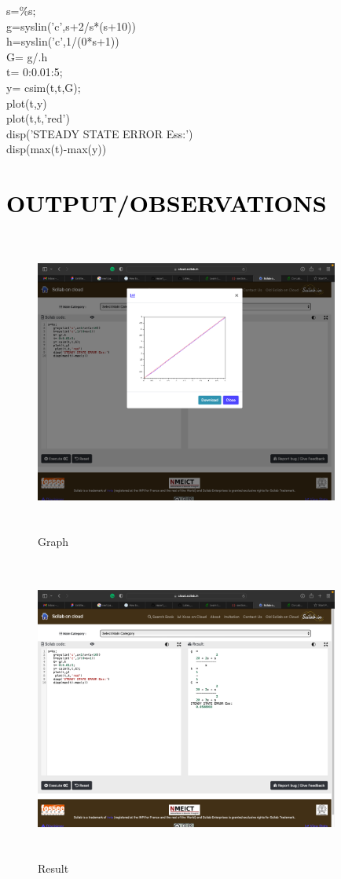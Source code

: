 \documentclass[12pt]{article}
\begin{document}
   s=\%s;\\ 
   g=syslin('c',s+2/s*(s+10))\\
   h=syslin('c',1/(0*s+1))\\
   G= g/.h\\
   t= 0:0.01:5;\\
   y= csim(t,t,G);\\
   plot(t,y)\\
    plot(t,t,'red')\\
   disp('STEADY STATE ERROR Ess:')\\
   disp(max(t)-max(y)) \par 

\section*{\textcolor{black}{OUTPUT/OBSERVATIONS}}

\begin{figure}[!hth]
        \centering
        \includegraphics[width =10cm, height = 10cm]{images/exp51.png}
        \caption{Graph}
        \label{Graph}
\end{figure}
\begin{figure}[!hth]
        \centering
        \includegraphics[width =10cm, height = 10cm]{images/exp52.png}
        \caption{Result}
        \label{Result}
\end{figure}
\end{document}
